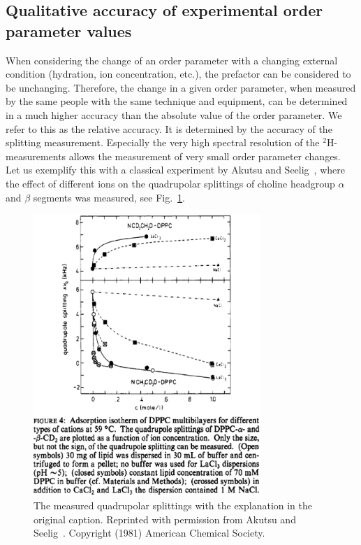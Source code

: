 \documentclass[aps,prl,superscriptaddress,twocolumn]{revtex4}
\begin{document}
\subsection{Qualitative accuracy of experimental order parameter values}

When considering the change of an order parameter with a changing external condition (hydration, ion concentration, etc.), 
the prefactor can be considered to be unchanging. Therefore, the change in a given order parameter, when measured by the 
same people with the same technique and equipment, can be determined in a much higher accuracy than the absolute value of 
the order parameter. We refer to this as the relative accuracy. It is determined by the accuracy of the splitting measurement. 
Especially the very high spectral resolution of the $^2$H-measurements allows the measurement of very small order parameter changes. 
Let us exemplify this with a classical experiment by Akutsu and Seelig~\cite{akutsu81}, where the effect of different ions on 
the quadrupolar splittings of choline headgroup $\alpha$ and $\beta$ segments was measured, see Fig.~\ref{QUADsplitIONeffect}. 
\begin{figure}[]
  \includegraphics[width=8.6cm]{../Fig/QUADsplitIONeffect.eps}
\newline
  \caption{\label{QUADsplitIONeffect}
    The measured quadrupolar splittings with the explanation in the original caption. 
    Reprinted with permission from Akutsu and Seelig~\cite{akutsu81}. Copyright (1981) American Chemical Society.
} 
\end{figure}
\end{document}

